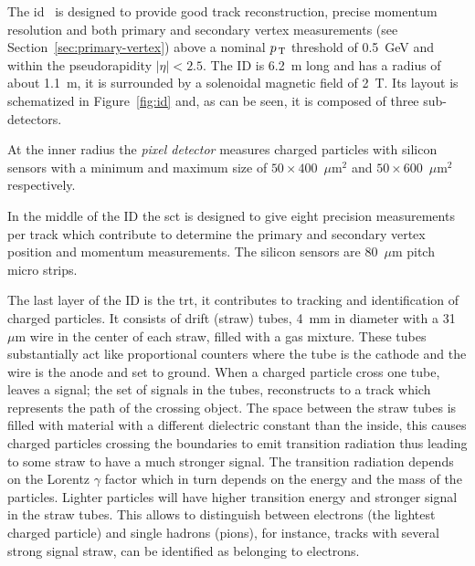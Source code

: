 The \gls{id}~\cite{ATLASPaper} is designed to provide good track reconstruction,
precise momentum resolution and both primary and secondary vertex measurements
(see Section~\ref{sec:primary-vertex}) above a nominal $p_\mathrm{\, T}$ threshold of
0.5~GeV and within the pseudorapidity $|\eta| < 2.5$. The ID is 6.2~m long and
has a radius of about 1.1~m, it is surrounded by a solenoidal magnetic field of
2~T. Its layout is schematized in Figure~\ref{fig:id} and, as can be seen, it is
composed of three sub-detectors.

At the inner radius the \emph{pixel detector} measures charged particles with
silicon sensors with a minimum and maximum size of $50 \times 400$~$\mu$m$^2$
and $50 \times 600$~$\mu$m$^2$ respectively.

In the middle of the ID the \gls{sct} is designed to give eight precision
measurements per track which contribute to determine the primary and secondary
vertex position and momentum measurements. The silicon sensors are 80~$\mu$m
pitch micro strips.

The last layer of the ID is the \gls{trt}, it contributes to tracking and
identification of charged particles. It consists of drift (straw) tubes, 4~mm in
diameter with a 31~$\mu$m wire in the center of each straw, filled with a gas
mixture. These tubes substantially act like proportional counters where the tube
is the cathode and the wire is the anode and set to ground. When a charged
particle cross one tube, leaves a signal; the set of signals in the tubes,
reconstructs to a track which represents the path of the crossing object. The
space between the straw tubes is filled with material with a different
dielectric constant than the inside, this causes charged particles crossing the
boundaries to emit transition radiation thus leading to some straw to have a
much stronger signal. The transition radiation depends on the Lorentz $\gamma$
factor which in turn depends on the energy and the mass of the particles.
Lighter particles will have higher transition energy and stronger signal in the
straw tubes. This allows to distinguish between electrons (the lightest charged
particle) and single hadrons (pions), for instance, tracks with several strong
signal straw, can be identified as belonging to electrons.

